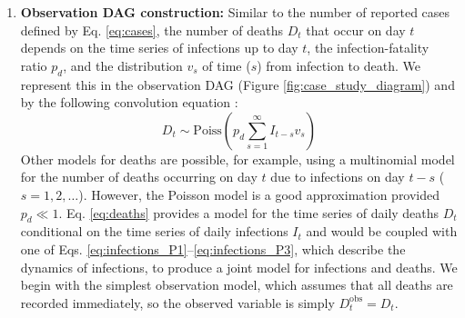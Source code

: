\documentclass{article}
\begin{document}
\begin{enumerate}
    \item \textbf{Observation DAG construction:} Similar to the number of reported cases defined by Eq. \eqref{eq:cases}, the number of deaths $D_t$ that occur on day $t$ depends on the time series of infections up to day $t$, the infection-fatality ratio $p_d$, and the distribution $v_s$ of time ($s$) from infection to death. We represent this in the observation \ac{DAG} (Figure \ref{fig:case_study_diagram}) and by the following convolution equation \citep{bhatt2023semi}:
    \begin{equation} \label{eq:deaths}
        D_t \sim \mathrm{Poiss}\left(p_d \sum_{s=1}^\infty I_{t-s}v_s \right)
    \end{equation}
    Other models for deaths are possible, for example, using a multinomial model for the number of deaths occurring on day $t$ due to infections on day $t-s$ ($s=1,2,\ldots$). However, the Poisson model is a good approximation provided $p_d\ll 1$. 
    Eq. \eqref{eq:deaths} provides a model for the time series of daily deaths $D_t$ conditional on the time series of daily infections $I_t$ and would be coupled with one of Eqs. \eqref{eq:infections_P1}--\eqref{eq:infections_P3}, which describe the dynamics of infections, to produce a joint model for infections and deaths. We begin with the simplest observation model, which assumes that all deaths are recorded immediately, so the observed variable is simply $D^\mathrm{obs}_t=D_t$.
    



\end{enumerate}
\end{document}
